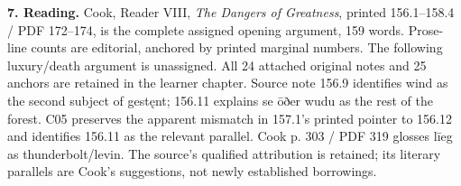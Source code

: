 \textbf{7. Reading.} Cook, Reader VIII, \emph{The Dangers of Greatness}, printed 156.1–158.4 /\allowbreak{} PDF 172–174, is the complete assigned opening argument, 159 words. Prose-line counts are editorial, anchored by printed marginal numbers. The following luxury/\allowbreak{}death argument is unassigned. All 24 attached original notes and 25 anchors are retained in the learner chapter. Source note 156.9 identifies wind as the second subject of gestęnt; 156.11 explains se ōðer wudu as the rest of the forest. C05 preserves the apparent mismatch in 157.1's printed pointer to 156.12 and identifies 156.11 as the relevant parallel. Cook p. 303 /\allowbreak{} PDF 319 glosses līeg as thunderbolt/\allowbreak{}levin. The source's qualified attribution is retained; its literary parallels are Cook's suggestions, not newly established borrowings.

\endgroup

\par\label{end-ch14-key}
\clearpage\endgroup
